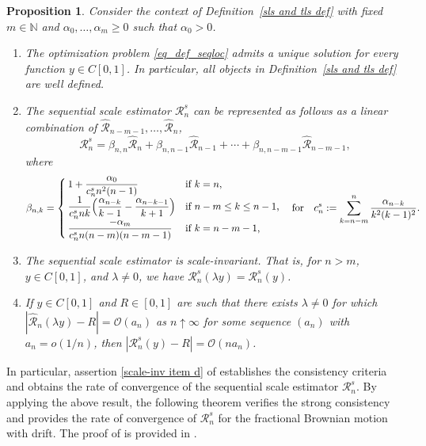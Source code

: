 \documentclass[12pt,reqno]{article}
\def\ua{\uparrow}
\def\wh{\widehat}
\newcommand\scalemath[2]{\scalebox{#1}{\mbox{\ensuremath{\displaystyle #2}}}}
\numberwithin{equation}{section}
\def\cR{{\mathscr R}}
\newtheorem{proposition}[theorem]{Proposition}
\theoremstyle{definition}
\def\ua{\uparrow}
\def\wh{\widehat}
\newcommand{\bN}{\mathbb{N}}
\begin{document}
\begin{proposition}\label{scale-inv prop} Consider the context of Definition~\ref{sls and tls def}  with fixed $m\in\bN$ and $\alpha_0,\dots,\alpha_{m}\ge0$ such that $\alpha_0>0$.
\begin{enumerate}
\item The  optimization problem  \eqref{eq_def_seqloc} admits a unique solution for every function $y\in C[0,1]$. In particular, all objects in Definition~\ref{sls and tls def} are well defined.
\item The sequential scale estimator $\cR^s_{n}$ can be represented as follows as a  linear combination of $\wh\cR_{n-m-1},\dots, \wh\cR_n$,
\begin{equation*}
	\cR_n^s = \beta_{n,n}\wh\cR_n + \beta_{n,n-1}\wh\cR_{n-1} + \cdots + \beta_{n,n-m-1}\wh\cR_{n-m-1},
\end{equation*}
where
\begin{equation}\label{eq beta nk}
	\scalemath{0.9}{\beta_{n,k}=\begin{cases}\displaystyle1+\frac{\alpha_0}{c^{\textrm{\rm s}}_{n}n^2(n-1)}&\text{if $k=n$,}\\
		\displaystyle\frac1{c^{\textrm{\rm s}}_{n}nk}\Big(\frac{\alpha_{n-k}}{k-1}-\frac{\alpha_{n-k-1}}{k+1}\Big)&\text{if $n-m\le k\le n-1$,}\\
		\displaystyle
		\frac{-\alpha_m}{c^{\textrm{\rm s}}_{n}n(n-m)(n-m-1)}&\text{if $ k= n-m-1$,}
	\end{cases}\quad\text{for}\quad c^{s}_{n}:= \sum_{k = n-m}^{n}\frac{\alpha_{n-k}}{k^{2}(k-1)^{2}}.}
\end{equation}

\item The sequential scale estimator is scale-invariant. That is,  for $n>m$, $y \in C[0,1]$, and $\lambda \neq 0$, we have $\cR^s_{n}(\lambda y) = \cR^s_{n}(y)$.
	\item If $y\in C[0,1]$ and $R\in[0,1]$ are such that there exists $\lambda\neq 0$ for which $|\wh\cR_n(\lambda y)-R|=\mathcal{O}(a_n)$ as $n\ua\infty$ for some sequence $(a_n)$ with $a_n=o(1/n)$, then $			|\cR^s_{n}(y)-R| =\mathcal{O}(na_n)$. \label{scale-inv item d}
\end{enumerate}
\end{proposition}

In particular, assertion \ref{scale-inv item d} of  establishes the consistency criteria and obtains the rate of convergence of the sequential scale estimator $\cR^s_n$. By applying the above result, the following theorem verifies the strong consistency and provides the rate of convergence of $ \cR^s_n$ for the fractional Brownian motion with drift. The proof of  is provided in .
\end{document}

